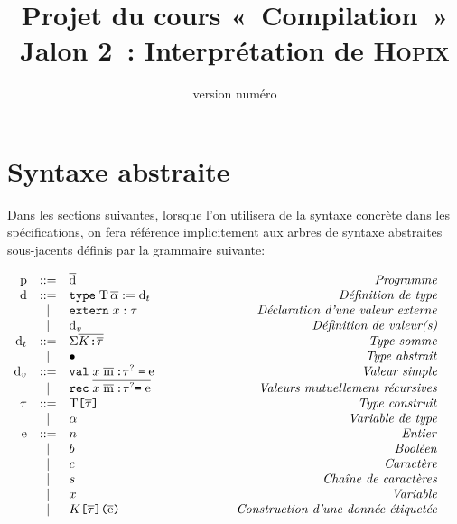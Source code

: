 \documentclass[a4paper,8pt]{article}
\title{
\vspace{-1.5cm}
Projet du cours «~Compilation~» \\
Jalon 2~: Interprétation de \textsc{Hopix}
}
\date{\scriptsize version numéro }
\newcommand{\comment}[1]{\hspace{3cm}\hfill \mbox{\textit{#1}}}
\newenvironment{BNF}[1][\linewidth]%
{\begin{math}\begin{array}{rclr}}%
{\end{array}\end{math}}%
\newcommand{\kwd}[1]{\texttt{#1}}
\newcommand{\rul}[1]{#1}
\newcommand{\car}[1]{\texttt{#1}}
\newcommand\type{\tau}
\newcommand\otype{\tau^?}
\newcommand\meta[1]{\textrm{#1}}
\newcommand\expr{\meta{e}}
\newcommand\definition{\meta{d}}
\newcommand\vdefinition{\meta{d}_v}
\newcommand\tdefinition{\meta{d}_t}
\newcommand\program{\meta{p}}
\newcommand\typecon{\meta{T}}
\newcommand\tvar{\alpha}
\newcommand\id{x}
\newcommand\cid{K}
\newcommand\lint{n}
\newcommand\lchar{c}
\newcommand\lbool{b}
\newcommand\lstring{s}
\newcommand\pattern{\meta{m}}
\newlength\codewidth
\newenvironment{code}[1][\codewidth]{
\begin{center}
\Sbox
\hspace{0.3cm}\minipage{#1}\small
}{
\endminipage
\endSbox\fbox{\TheSbox}
\end{center}
}
\newcommand\many[1]{\overline{#1}}
\begin{document}
\maketitle

\section{Syntaxe abstraite}

Dans les sections suivantes, lorsque l'on utilisera de la syntaxe
concrète dans les spécifications, on fera référence implicitement
aux arbres de syntaxe abstraites sous-jacents définis par la grammaire
suivante:

\begin{code}[17cm]
\begin{BNF}
\program  & $::=$  & \many{\definition} \comment{Programme} 
\\
\definition
& $::=$
& {\kwd{type}}\;
 \typecon \,\many\tvar := \tdefinition
 \comment{Définition de type}
\\
& | &
\kwd{extern}\; \id \,\car{:}\, \type
\comment{Déclaration d'une valeur externe}
\\
& | &  \vdefinition
\comment{Définition de valeur(s)}
\\
\tdefinition & $::=$ &
\Sigma
\many{\cid \car{:} \many\type}
\comment{Type somme}
\\
& | &
\bullet
\comment{Type abstrait}
\\
\vdefinition & $::=$ &
\kwd{val} \; \id \;\many{\pattern}\, \car{:} \otype  \;\car{=}\; \rul{\expr}
\comment{Valeur simple}
\\
& | &
\kwd{rec}\;
\many{\id\; \many{\pattern}\, \car{:} \otype  \car{=} \; \rul{\expr}}
\comment{Valeurs mutuellement récursives}
\\
\type
& $::=$ & \typecon \car{[} \many\type\car{]}
\comment{Type construit}\\
& | & \tvar
\comment{Variable de type}
\\
\expr      & $::=$ & \lint \comment{Entier} \\
          &   | & \lbool \comment{Booléen} \\
          &   | & \lchar \comment{Caractère} \\
          &   | & \lstring \comment{Chaîne de caractères} \\
          &   | & \id                            \comment{Variable} \\
          &   | & \cid \car{[} \many\type \car{]} \car{(} \many{\expr} \car{)}
                  \comment{Construction d'une donnée étiquetée} \\

\end{BNF}
\end{code}
\end{document}
